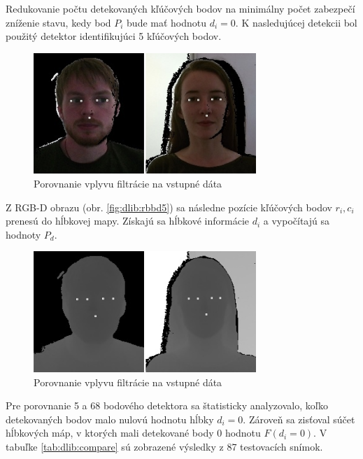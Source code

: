 Redukovanie počtu detekovaných kľúčových bodov na minimálny počet zabezpečí zníženie stavu, kedy bod $P_i$ bude mať hodnotu $d_i=0$. K nasledujúcej detekcii bol použitý detektor identifikujúci 5 kľúčových bodov. 
 
\begin{figure}[H]
	\centering
	\includegraphics[width=0.75\textwidth]{figures/rgbd_points.png}
	\caption{Porovnanie vplyvu filtrácie na vstupné dáta}
	\label{fig:dlib:rbbd5}
	\label{fig:dlib:rbbd5:b}
\end{figure}

Z RGB-D obrazu (obr. \ref{fig:dlib:rbbd5}) sa následne pozície kľúčových bodov $r_i, c_i$ prenesú do hĺbkovej mapy. Získajú sa hĺbkové informácie $d_i$ a vypočítajú sa hodnoty $P_d$. 

\begin{figure}[H]
	\centering
	\includegraphics[width=0.75\textwidth]{figures/depth_points.png}
	\caption{Porovnanie vplyvu filtrácie na vstupné dáta}
	\label{fig:algorithm:result:a}
	\label{fig:algorithm:result:b}
	\label{fig:algorithm:result:c}
\end{figure}

Pre porovnanie 5 a 68 bodového detektora sa štatisticky analyzovalo, koľko detekovaných bodov malo nulovú hodnotu hĺbky $d_i=0$. Zároveň sa zisťoval súčet hĺbkových máp, v ktorých mali detekované body 0 hodnotu $F(d_i=0)$. V tabuľke \ref{tab:dlib:compare} sú zobrazené výsledky z 87 testovacích snímok.  

